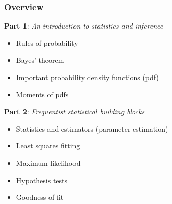 
\def\mytitle{Part 1: An introduction to statistics and inference}
\def\mydate{25 March 2015}
\def\myauthor{Matthew Pitkin}
\def\affiliation{University of Glasgow}
\def\latexxslt{beamer}
\def\latexmode{beamer}
\def\theme{m}
\def\event{GraWIToN School}



%


\begin{frame}

\frametitle{Overview}
\label{overview}

\textbf{Part 1}: \emph{An introduction to statistics and inference}

\begin{itemize}
\item Rules of probability

\item Bayes' theorem

\item Important probability density functions (pdf)

\item Moments of pdfs

\end{itemize}

\textbf{Part 2}: \emph{Frequentist statistical building blocks}

\begin{itemize}
\item Statistics and estimators (parameter estimation)

\item Least squares fitting

\item Maximum likelihood

\item Hypothesis tests

\item Goodness of fit

\end{itemize}

\end{frame}

